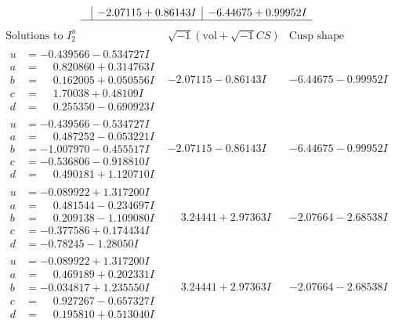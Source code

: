 \documentclass[1p]{elsarticle_modified}
\theoremstyle{definition}
\newcommand{\I}{\sqrt{-1}}
\begin{document}
$$\begin{array}{c|c|c}
 & -2.07115 + 0.86143 I & -6.44675 + 0.99952 I\\
 \hline 
 \end{array}$$\newpage$$\begin{array}{c|c|c}  
\text{Solutions to }I^u_{2}& \I (\text{vol} + \sqrt{-1}CS) & \text{Cusp shape}\\
 \hline 
\begin{aligned}
u &= -0.439566 - 0.534727 I \\
a &= \phantom{-}0.820860 + 0.314763 I \\
b &= \phantom{-}0.162005 + 0.050556 I \\
c &= \phantom{-}1.70038 + 0.48109 I \\
d &= \phantom{-}0.255350 - 0.690923 I\end{aligned}
 & -2.07115 - 0.86143 I & -6.44675 - 0.99952 I \\ \hline\begin{aligned}
u &= -0.439566 - 0.534727 I \\
a &= \phantom{-}0.487252 - 0.053221 I \\
b &= -1.007970 - 0.455517 I \\
c &= -0.536806 - 0.918810 I \\
d &= \phantom{-}0.490181 + 1.120710 I\end{aligned}
 & -2.07115 - 0.86143 I & -6.44675 - 0.99952 I \\ \hline\begin{aligned}
u &= -0.089922 + 1.317200 I \\
a &= \phantom{-}0.481544 - 0.234697 I \\
b &= \phantom{-}0.209138 - 1.109080 I \\
c &= -0.377586 + 0.174434 I \\
d &= -0.78245 - 1.28050 I\end{aligned}
 & \phantom{-}3.24441 + 2.97363 I & -2.07664 - 2.68538 I \\ \hline\begin{aligned}
u &= -0.089922 + 1.317200 I \\
a &= \phantom{-}0.469189 + 0.202331 I \\
b &= -0.034817 + 1.235550 I \\
c &= \phantom{-}0.927267 - 0.657327 I \\
d &= \phantom{-}0.195810 + 0.513040 I\end{aligned}
 & \phantom{-}3.24441 + 2.97363 I & -2.07664 - 2.68538 I \\ \hline\begin{aligned}

\end{aligned}
\end{array}$$
\end{document}
